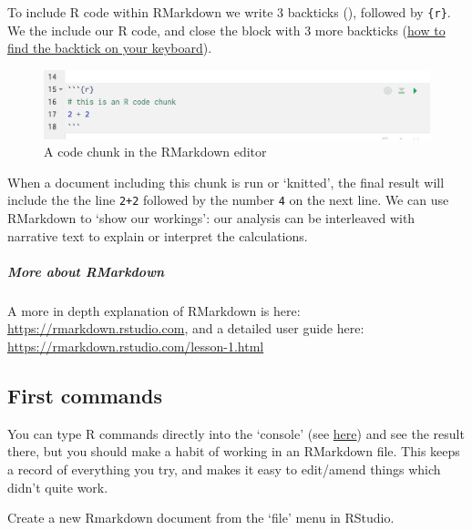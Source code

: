 \documentclass[]{article}
\let\oldparagraph\paragraph
\renewcommand{\paragraph}[1]{\oldparagraph{#1}\mbox{}}
\let\oldsubparagraph\subparagraph
\renewcommand{\subparagraph}[1]{\oldsubparagraph{#1}\mbox{}}
\begin{document}
To include R code within RMarkdown we write 3 backticks (\texttt{\textasciigrave{}\textasciigrave{}\textasciigrave{}}), followed by
\texttt{\{r\}}. We the include our R code, and close the block with 3 more backticks
(\protect\hyperlink{backtick-location}{how to find the backtick on your keyboard}).

\begin{figure}
\centering
\includegraphics{media/r-code-chunk.png}
\caption{A code chunk in the RMarkdown editor}
\end{figure}

When a document including this chunk is run or `knitted', the final result will
include the the line \texttt{2+2} followed by the number \texttt{4} on the next line. We can
use RMarkdown to `show our workings': our analysis can be interleaved with
narrative text to explain or interpret the calculations.

\hypertarget{more-about-rmarkdown}{%
\subparagraph{More about RMarkdown}\label{more-about-rmarkdown}}

A more in depth explanation of RMarkdown is here:
\url{https://rmarkdown.rstudio.com}, and a detailed
user guide here:
\url{https://rmarkdown.rstudio.com/lesson-1.html}

\hypertarget{first-commands}{%
\subsection*{First commands}\label{first-commands}}

You can type R commands directly into the `console' (see \protect\hyperlink{rstudio}{here}) and
see the result there, but you should make a habit of working in an RMarkdown
file. This keeps a record of everything you try, and makes it easy to edit/amend
things which didn't quite work.

Create a new Rmarkdown document from the `file' menu in RStudio.

\hypertarget{section}{%
\paragraph{}\label{section}}
\end{document}
